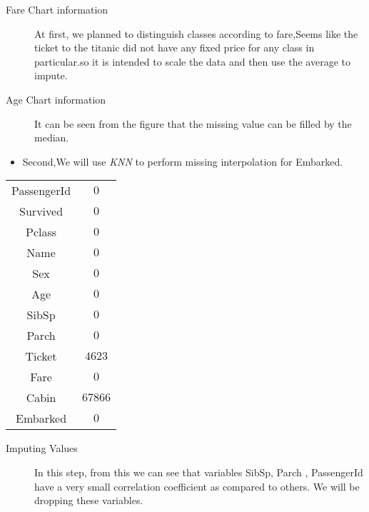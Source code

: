 \begin{description}
	\item[Fare Chart information]
	At first, we planned to distinguish classes according to fare,Seems like the ticket to the titanic did not have any fixed price for any class in particular.so it is intended to scale the data and then use the average to impute.
\end{description}

\begin{description}
	\item[Age Chart information]
	It can be seen from the figure that the missing value can be filled by the median.
\end{description}
\vspace{.5cm}

\begin{itemize}
\item Second,We will use \emph{KNN} to perform missing interpolation for Embarked.
\end{itemize}
\vspace{.5cm}
\begin{center}	
	\begin{tabular}{c|c}
		\toprule
		\midrule
		{PassengerId}
		&  {$0$} \\
		{Survived}
		&  {$0$} \\
		{Pclass}
		&  {$0$} \\
		{Name}
		&  {$0$} \\
		{Sex}
		&  {$0$} \\
		{Age}
		&  {$0$} \\
		{SibSp}
		&  {$0$} \\
		{Parch}
		&  {$0$} \\
		{Ticket}
		&  {$4623$} \\
		{Fare}
		&  {$0$} \\
		{Cabin}
		&  {$67866$} \\
		{Embarked}
		&  {$0$} \\
		\bottomrule
	\end{tabular}
\end{center}
\vspace{.5cm}
\begin{description}
	\item[Imputing Values]
	In this step,
	from this we can see that variables SibSp, Parch , PassengerId have a very small
	correlation coefficient as compared to others. We will be dropping these variables.
\end{description}

